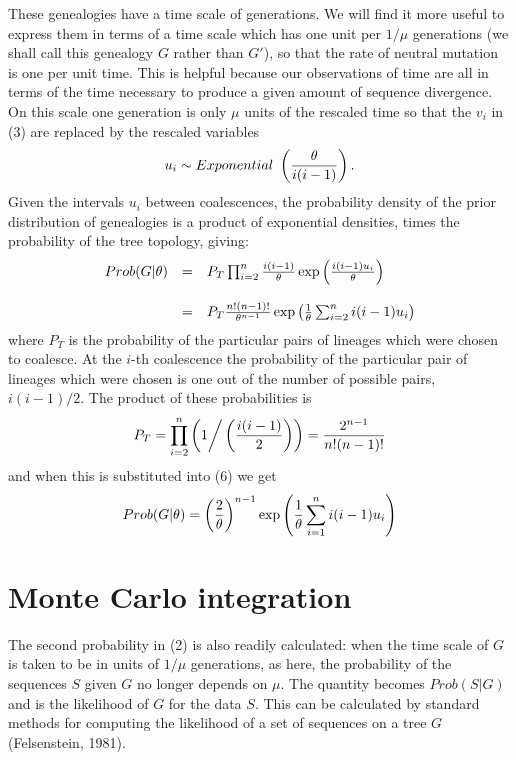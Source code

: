 These genealogies have a time scale of generations.  We will find it more
useful to express them in terms of a time scale which has one unit per
$1/\mu$ generations (we shall call this genealogy $G$ rather than $G'$), so that the rate
of neutral mutation is one per unit
time.  This is helpful because our observations of time are all in terms
of the time necessary to produce a given amount of sequence divergence.
On this scale one generation is only $\mu$ units of the rescaled time so that
the $v_i$ in (3) are replaced by the rescaled variables
\begin{equation} %
u_i \sim Exponential~\left({\theta \over i(i-1)}\right).
\end{equation}
Given the intervals $u_i$ between coalescences, the probability density
of the prior distribution of genealogies is a product of exponential
densities, times the probability of the tree topology, giving:
\begin{equation} %
\begin{array}{c c l}
Prob (G | \theta) & = & P_T \prod_{i=2}^n  {i(i-1) \over \theta} \exp\left({i(i-1)u_i \over \theta}\right)\\
 & & \\
 & = & P_T {n! (n-1)! \over \theta^{n-1}} \exp\left({1 \over \theta} \sum_{i=2}^n i(i-1)u_i\right)
\end{array}
\end{equation}
where $P_T$ is the probability of the particular pairs of lineages which
were chosen to coalesce.  At the $i$-th coalescence the probability of the
particular pair of lineages which were chosen is one out of the number of
possible pairs, $i(i-1)/2$.  The product of these
probabilities is
\begin{equation} %
P_T =  \prod_{i=2}^n \left(1 \bigg/ \left( {i(i-1) \over 2} \right) \right)  = {2^{n-1} \over n! (n-1)!}
\end{equation}
and when this is substituted into (6) we get
\begin{equation} %
Prob (G | \theta)  = \left({2 \over \theta}\right)^{n-1} \exp\left({1 \over \theta} \sum_{i=1}^n i(i-1)u_i\right)
\end{equation}

\bigskip

\section{Monte Carlo integration}

The second probability in (2) is also readily calculated: when the time scale
of $G$ is taken to be in units of $1/\mu$ generations, as here, the 
probability of the sequences $S$ given $G$ no longer depends on $\mu$.
The quantity becomes $Prob(S | G)$ and is the likelihood of $G$ for the
data $S$.  This can be calculated by standard methods for computing the
likelihood of a set of sequences on a tree $G$ (Felsenstein, 1981).

